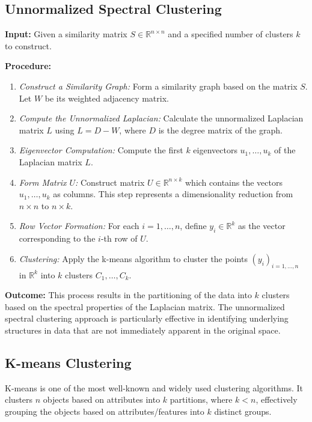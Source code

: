 \documentclass[unicode,11pt,a4paper,oneside,numbers=endperiod,openany]{scrartcl}
\begin{document}
\subsection{Unnormalized Spectral Clustering}

\textbf{Input:} Given a similarity matrix \( S \in \mathbb{R}^{n \times n} \) and a specified number of clusters \( k \) to construct.

\textbf{Procedure:}
\begin{enumerate}
    \item \textit{Construct a Similarity Graph:} Form a similarity graph based on the matrix \( S \). Let \( W \) be its weighted adjacency matrix.

    \item \textit{Compute the Unnormalized Laplacian:} Calculate the unnormalized Laplacian matrix \( L \) using \( L = D - W \), where \( D \) is the degree matrix of the graph.

    \item \textit{Eigenvector Computation:} Compute the first \( k \) eigenvectors \( u_1, \ldots, u_k \) of the Laplacian matrix \( L \).

    \item \textit{Form Matrix \( U \):} Construct matrix \( U \in \mathbb{R}^{n \times k} \) which contains the vectors \( u_1, \ldots, u_k \) as columns. This step represents a dimensionality reduction from \( n \times n \) to \( n \times k \).

    \item \textit{Row Vector Formation:} For each \( i = 1, \ldots, n \), define \( y_i \in \mathbb{R}^k \) as the vector corresponding to the \( i \)-th row of \( U \).

    \item \textit{Clustering:} Apply the k-means algorithm to cluster the points \( (y_i)_{i=1, \ldots, n} \) in \( \mathbb{R}^k \) into \( k \) clusters \( C_1, \ldots, C_k \).
\end{enumerate}

\textbf{Outcome:}
This process results in the partitioning of the data into \( k \) clusters based on the spectral properties of the Laplacian matrix. The unnormalized spectral clustering approach is particularly effective in identifying underlying structures in data that are not immediately apparent in the original space.

\subsection{K-means Clustering}
K-means is one of the most well-known and widely used clustering algorithms. It clusters \( n \) objects based on attributes into \( k \) partitions, where \( k < n \), effectively grouping the objects based on attributes/features into \( k \) distinct groups.
\end{document}
